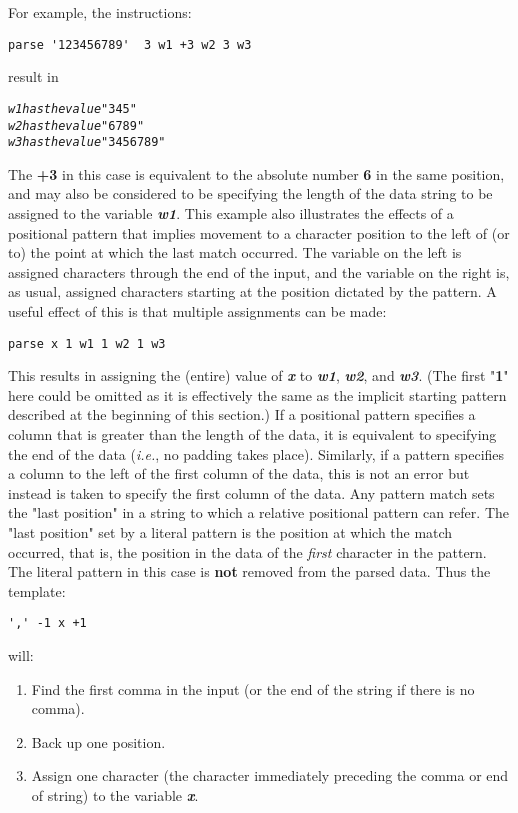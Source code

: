 For example, the instructions:
\begin{lstlisting}
parse '123456789'  3 w1 +3 w2 3 w3
\end{lstlisting}
result in
\begin{alltt}
\emph{w1} \emph{has the value} "345"
\emph{w2} \emph{has the value} "6789"
\emph{w3} \emph{has the value} "3456789"
\end{alltt}
The \textbf{+3} in this case is equivalent to the absolute
number \textbf{6} in the same position, and may also be considered to
be specifying the length of the data string to be assigned to the
variable \textbf{\emph{w1}}.
 This example also illustrates the effects of a positional pattern
that implies movement to a character position to the left of (or to)
the point at which the last match occurred.
The variable on the left is assigned characters through the end of the
input, and the variable on the right is, as usual, assigned characters
starting at the position dictated by the pattern.
 A useful effect of this is that multiple assignments can be made:
\begin{lstlisting}
parse x 1 w1 1 w2 1 w3
\end{lstlisting}
This results in assigning the (entire) value
of \textbf{\emph{x}}
to \textbf{\emph{w1}}, \textbf{\emph{w2}},
and \textbf{\emph{w3}}.
(The first "\textbf{1}" here could be omitted as it is
effectively the same as the implicit starting pattern described at the
beginning of this section.)
 If a positional pattern specifies a column that is greater than the
length of the data, it is equivalent to specifying the end of the data
(\emph{i.e.}, no padding takes place).
Similarly, if a pattern specifies a column to the left of the first
column of the data, this is not an error but instead is taken to
specify the first column of the data.
 Any pattern match sets the "last position" in a string to which
a relative positional pattern can refer.
The "last position" set by a literal pattern is the position at
which the match occurred, that is, the position in the data of the
\emph{first} character in the pattern.
The literal pattern in this case is \textbf{not} removed from the
parsed data.
Thus the template:
\begin{lstlisting}
',' -1 x +1
\end{lstlisting}
 will:
\begin{enumerate}
\item Find the first comma in the input (or the end of the string if
there is no comma).
\item Back up one position.
\item Assign one character (the character immediately preceding the comma
or end of string) to the variable \textbf{\emph{x}}.
\end{enumerate}

